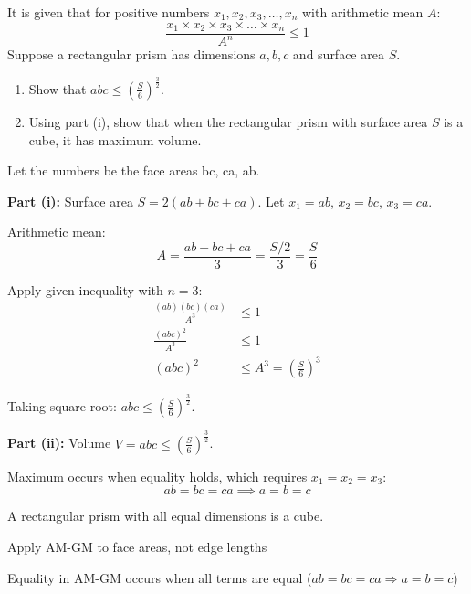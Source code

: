 \begin{problem}
It is given that for positive numbers $x_1, x_2, x_3, \dots, x_n$ with arithmetic mean $A$:
\[
\frac{x_1 \times x_2 \times x_3 \times \dots \times x_n}{A^n} \le 1
\]
Suppose a rectangular prism has dimensions $a, b, c$ and surface area $S$.
\begin{enumerate}
    \item[(i)] Show that $abc \le \left(\frac{S}{6}\right)^{\frac{3}{2}}$.
    \item[(ii)] Using part (i), show that when the rectangular prism with surface area $S$ is a cube, it has maximum volume.
\end{enumerate}
\end{problem}

\begin{hint}
Let the numbers be the face areas bc, ca, ab.
\end{hint}

\begin{solution}
\textbf{Part (i):} Surface area $S = 2(ab + bc + ca)$. Let $x_1 = ab$, $x_2 = bc$, $x_3 = ca$.

Arithmetic mean:
\[ A = \frac{ab + bc + ca}{3} = \frac{S/2}{3} = \frac{S}{6} \]

Apply given inequality with $n=3$:
\begin{align*}
\frac{(ab)(bc)(ca)}{A^3} &\leq 1 \\
\frac{(abc)^2}{A^3} &\leq 1 \\
(abc)^2 &\leq A^3 = \left(\frac{S}{6}\right)^3
\end{align*}

Taking square root: $abc \leq \left(\frac{S}{6}\right)^{\frac{3}{2}}$.

\textbf{Part (ii):} Volume $V = abc \leq \left(\frac{S}{6}\right)^{\frac{3}{2}}$. 

Maximum occurs when equality holds, which requires $x_1 = x_2 = x_3$:
\[ ab = bc = ca \implies a = b = c \]

A rectangular prism with all equal dimensions is a cube.
\end{solution}

\begin{takeaways}
\item Apply AM-GM to face areas, not edge lengths
\item Equality in AM-GM occurs when all terms are equal ($ab = bc = ca \Rightarrow a = b = c$)
\end{takeaways}
